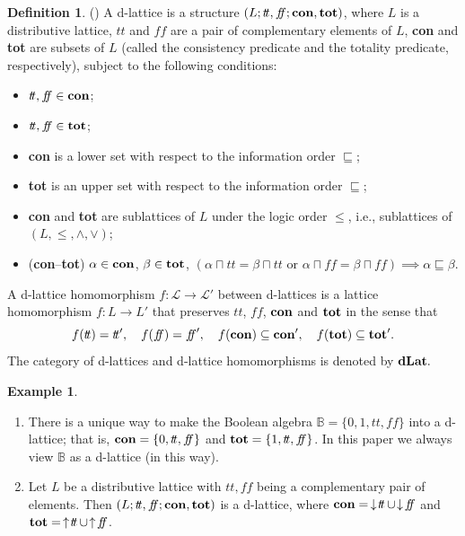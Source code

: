 \documentclass[11pt]{article}
\theoremstyle{plain}
\theoremstyle{definition}
\newtheorem{defn}[thm]{Definition}
\newtheorem{exmp}[thm]{Example}
\newcommand{\dbt}{{t\!t}}
\newcommand{\dbf}{{f\!\!f}}
\newcommand{\dLat}{\bf dLat}
\begin{document}
\begin{defn} (\cite{Klinke,KJM})
A  d-lattice is a structure $(L;\dbt,\dbf;{\bf con},{\bf tot})$, where  $L$ is a  distributive lattice, $\dbt$ and $\dbf$ are a pair of  complementary elements of $L$,  {\bf con}  and {\bf tot}  are subsets of $L$ (called the  consistency predicate  and the  totality  predicate, respectively), subject to the following conditions:
\begin{itemize} \setlength{\itemsep}{0pt}		
\item  $\dbt,\dbf\in{\bf con}$; 

\item   $\dbt,\dbf\in{\bf tot}$;
			
\item {\bf con} is a lower set with respect to the information order $\sqsubseteq$;  

\item   {\bf tot} is an upper set with respect to the information order $\sqsubseteq$;  

\item   {\bf con} and {\bf tot} are sublattices of $L$ under the logic order $\leq$, i.e., sublattices of  $(L,\leq,\wedge,\vee)$;  
 
\item ({\bf con}--{\bf tot}) $\alpha\in{\bf con}$, $\beta\in{\bf tot}$,  $(\alpha\sqcap\dbt=\beta\sqcap\dbt\text{ or }\alpha\sqcap\dbf= \beta\sqcap\dbf)\implies \alpha\sqsubseteq\beta$.
\end{itemize} 

A d-lattice homomorphism $f\colon\mathcal{L}\longrightarrow\mathcal{L}'$ between d-lattices  
is a lattice homomorphism $f\colon L\longrightarrow L'$ that preserves $\dbt$, $\dbf$, ${\bf con}$ and ${\bf tot}$ in the sense that
$$f(\dbt)=\dbt',\quad f(\dbf)=\dbf',\quad f({\bf con})\subseteq{\bf con}',\quad f({\bf tot})\subseteq{\bf tot}'.$$
The category of d-lattices and d-lattice homomorphisms is denoted by  $\dLat.$  \end{defn}

\begin{exmp} \label{B as d-lattice} \begin{enumerate}[label=\rm(\roman*)] \setlength{\itemsep}{0pt}
\item There is a unique way to make the Boolean algebra $\mathbb{B}=\{0,1,\dbt,\dbf\}$ into a d-lattice; that is, ${\bf con}=\{0,\dbt,\dbf\}$ and ${\bf tot}=\{1,\dbt,\dbf\}$. In this paper we always view $\mathbb{B}$ as a d-lattice (in this way). 
\item Let $L$ be a distributive lattice with $\dbt,\dbf$ being a complementary pair of elements. Then $(L;\dbt,\dbf;{\bf con},{\bf tot})$  is a d-lattice, where   ${\bf con}= \thinspace\downarrow\!\dbt \thinspace \cup\! \downarrow\!\dbf$ and ${\bf tot}= \thinspace\uparrow\!\dbt\thinspace\cup\! \uparrow\!\dbf$. 
\end{enumerate} \end{exmp}
\end{document}
